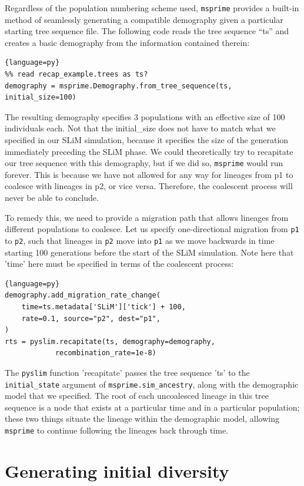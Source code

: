 \documentclass[12pt]{article}
\newcommand{\msprime}[0]{\texttt{msprime}\xspace}
\newcommand{\pyslim}[0]{\texttt{pyslim}\xspace}
\newcommand{\p}[1]{\texttt{p#1}}
\begin{document}
Regardless of the population numbering scheme used, \msprime provides a built-in method of seamlessly generating a
compatible demography given a particular starting tree sequence file. The following code reads the tree sequence ``ts''
and creates a basic demography from the information contained therein: 
\begin{lstlisting}{language=py}
%% read recap_example.trees as ts?
demography = msprime.Demography.from_tree_sequence(ts, initial_size=100)
\end{lstlisting}

The resulting demography specifies 3 populations with an effective size of 100 individuals each. Not that the initial_size
does not have to match what we specified in our SLiM simulation, because it specifies the size of the generation
immediately preceding the SLiM phase. We could theoretically try to recapitate our tree sequence with this
demography, but if we did so, \msprime would run forever. This is because we have not allowed for any way for
lineages from p1 to coalesce with lineages in p2, or vice versa. Therefore, the coalescent process will never be able to conclude.

To remedy this, we need to provide a migration path that allows lineages from different populations to coalesce.
Let us specify one-directional migration from \p1 to \p2, such that lineages in \p2 move into \p1 as we move backwards in time
starting 100 generations before the start of the SLiM simulation. Note here that 'time' here must be specified in terms of the coalescent process:
\begin{lstlisting}{language=py}
demography.add_migration_rate_change(
    time=ts.metadata['SLiM']['tick'] + 100,
    rate=0.1, source="p2", dest="p1",
)
rts = pyslim.recapitate(ts, demography=demography,
            recombination_rate=1e-8)
\end{lstlisting}

The \pyslim function 'recapitate' passes the tree sequence 'ts' to the
\texttt{initial\_state} argument of \texttt{msprime.sim\_ancestry},
along with the demographic model that we specified.
The root of each uncoalesced lineage in this tree sequence is a node
that exists at a particular time and in a particular population;
these two things situate the lineage within the demographic model,
allowing \msprime to continue following the lineages back through time.

\section{Generating initial diversity} %
\end{document}
